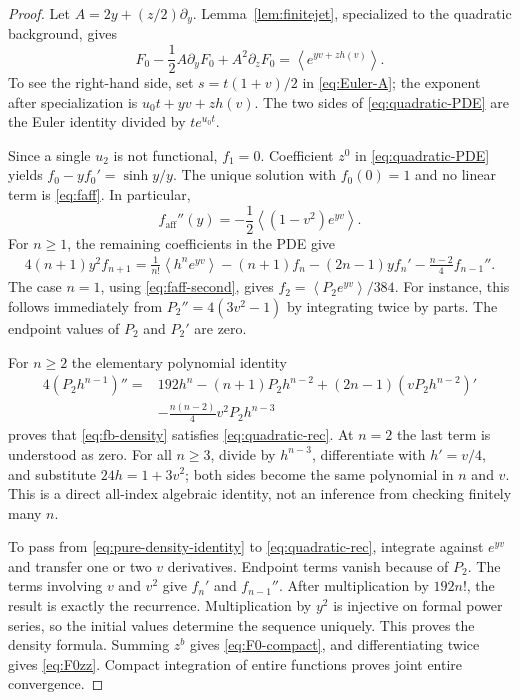 \documentclass[11pt]{article}
\numberwithin{equation}{section}
\theoremstyle{definition}\newtheorem{definition}[theorem]{Definition}
\theoremstyle{remark}\newtheorem{remark}[theorem]{Remark}
\newcommand{\avg}[1]{\left\langle #1\right\rangle}
\begin{document}
\begin{proof}
Let $A=2y+(z/2)\partial_y$. Lemma~\ref{lem:finitejet}, specialized to
the quadratic background, gives
\begin{equation}\label{eq:quadratic-PDE}
 F_0-\frac12A\partial_yF_0+A^2\partial_zF_0
 =\avg{e^{yv+zh(v)}}.
\end{equation}
To see the right-hand side, set $s=t(1+v)/2$ in
\eqref{eq:Euler-A}; the exponent after specialization is
$u_0t+yv+zh(v)$. The two sides of \eqref{eq:quadratic-PDE} are the
Euler identity divided by $te^{u_0t}$.

Since a single $u_2$ is not functional, $f_1=0$. Coefficient $z^0$
in \eqref{eq:quadratic-PDE} yields
$f_0-yf_0'=\sinh y/y$. The unique solution with $f_0(0)=1$ and no
linear term is \eqref{eq:faff}. In particular,
\begin{equation}\label{eq:faff-second}
 f_{\mathrm{aff}}''(y)=-\frac12\avg{(1-v^2)e^{yv}}.
\end{equation}
For $n\ge1$, the remaining coefficients in the PDE give
\begin{equation}\label{eq:quadratic-rec}
\begin{split}
 4(n+1)y^2f_{n+1}
 =\frac1{n!}\avg{h^ne^{yv}}
 -(n+1)f_n-(2n-1)yf_n'
 -\frac{n-2}{4}f_{n-1}''.
\end{split}
\end{equation}
The case $n=1$, using \eqref{eq:faff-second}, gives
$f_2=\avg{P_2e^{yv}}/384$. For instance, this follows immediately
from $P_2''=4(3v^2-1)$ by integrating twice by parts. The endpoint
values of $P_2$ and $P_2'$ are zero.

For $n\ge2$ the elementary polynomial identity
\begin{equation}\label{eq:pure-density-identity}
\begin{split}
 4(P_2h^{n-1})''={}&192h^n-(n+1)P_2h^{n-2}
 +(2n-1)(vP_2h^{n-2})'\\
 &-\frac{n(n-2)}4v^2P_2h^{n-3}
\end{split}
\end{equation}
proves that \eqref{eq:fb-density} satisfies \eqref{eq:quadratic-rec}.
At $n=2$ the last term is understood as zero. For all $n\ge3$, divide
by $h^{n-3}$, differentiate with $h'=v/4$, and substitute
$24h=1+3v^2$; both sides become the same polynomial in $n$ and $v$.
This is a direct all-index algebraic identity, not an inference from
checking finitely many $n$.

To pass from \eqref{eq:pure-density-identity} to
\eqref{eq:quadratic-rec}, integrate against $e^{yv}$ and transfer
one or two $v$ derivatives. Endpoint terms vanish because of $P_2$.
The terms involving $v$ and $v^2$ give $f_n'$ and $f_{n-1}''$.
After multiplication by $192n!$, the result is exactly the recurrence.
Multiplication by $y^2$ is injective on formal power series, so the
initial values determine the sequence uniquely. This proves the density
formula. Summing $z^b$ gives \eqref{eq:F0-compact}, and differentiating
twice gives \eqref{eq:F0zz}. Compact integration of entire functions
proves joint entire convergence.
\end{proof}
\end{document}
